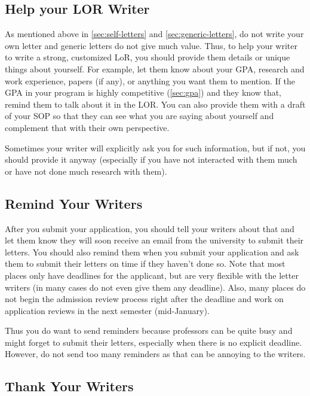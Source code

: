 \documentclass[oneside,11pt,dvipsnames]{book}
\begin{document}
\subsection{Help your LOR Writer}\label{sec:help-your-LOR-writers}

As mentioned above in \autoref{sec:self-letters} and \autoref{sec:generic-letters}, do not write your own letter and generic letters do not give much value. Thus, to help your writer to write a strong, customized LoR, you should provide them details or unique things about yourself. For example, let them know about your GPA, research and work experience, papers (if any), or anything you want them to mention.  If the GPA in your program is highly competitive (\autoref{sec:gpa}) and they know that, remind them to talk about it in the LOR. 
You can also provide them with a draft of your SOP so that they can see what you are saying about yourself and complement that with their own perspective.

Sometimes your writer will explicitly ask you for such information, but if not, you should provide it anyway (especially if you have not interacted with them much or have not done much research with them).


\subsection{Remind Your Writers}\label{sec:remind-writers} 

After you submit your application, you should tell your writers about that and let them know they will soon receive an email from the university to submit their letters.  You should also remind them when you submit your application and ask them to submit their letters on time if they haven't done so.  Note that most places only have deadlines for the applicant, but are very flexible with the letter writers (in many cases do not even give them any deadline).  Also, many places do not begin the admission review process right after the deadline and work on application reviews in the next semester (mid-January).  

Thus you do want to send reminders because professors can be quite busy and might forget to submit their letters, especially when there is no explicit deadline. However, do not send too many reminders as that can be annoying to the writers.


\subsection{Thank Your Writers}\label{sec:thank-writers}
\end{document}
